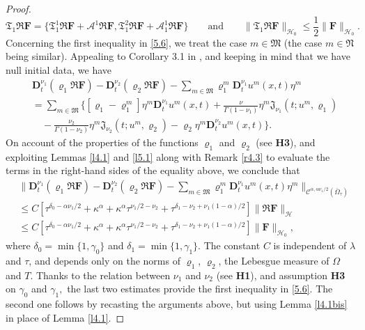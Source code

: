 \documentclass[reqno]{amsart}
\def\C {\mathcal{C}}
\theoremstyle{definition}
\numberwithin{equation}{section}
\begin{document}
\begin{proof}
\[
\mathfrak{T}_{1} \mathfrak{R}\mathbf{F}=\{\mathfrak{T}_{1}^{1}\mathfrak{R}\mathbf{F}+\mathcal{A}^{1}\mathfrak{R}\mathbf{F},
\mathfrak{T}_{1}^{2}\mathfrak{R}\mathbf{F}+\mathcal{A}^{1}_{1}\mathfrak{R}\mathbf{F}\}\qquad
\text{and}\qquad
\|\mathfrak{T}_{1} \mathfrak{R}\mathbf{F}\|_{\mathcal{H}_{0}}\leq\frac{1}{2}\|\mathbf{F}\|_{\mathcal{H}_{0}}.
\]
Concerning the first inequality in \eqref{5.6},
we treat the case $m\in\mathfrak{M}$ (the case $m\in\mathfrak{N}$ being similar).
Appealing to  Corollary 3.1 in \cite{KPSV4}, and keeping in mind that we have null initial data, we have
\begin{align*}
&\mathbf{D}_{t}^{\nu_{1}}(\varrho_{1} \mathfrak{R}\mathbf{F})-\mathbf{D}_{t}^{\nu_2}(\varrho_{2} \mathfrak{R}\mathbf{F})
-\sum_{m\in\mathfrak{M}}\varrho_{1}^{m}\mathbf{D}_{t}^{\nu_{1}}u^{m}(x,t)\eta^{m}\\
&=
\sum_{m\in\mathfrak{M}}\{[\varrho_{1}-\varrho_{1}^{m}]\eta^{m}\mathbf{D}_{t}^{\nu_{1}}u^{m}(x,t)
+\frac{\nu}{\Gamma(1-\nu_{1})}\eta^{m}\mathfrak{J}_{\nu_{1}}(t;u^{m},\varrho_{1})\\
&\quad -
\frac{\nu_2}{\Gamma(1-\nu_2)}\eta^{m}\mathfrak{J}_{\nu_2}(t;u^{m},\varrho_{2})
-\varrho_2\eta^{m}\mathbf{D}_{t}^{\nu_2}u^{m}(x,t)\}.
\end{align*}
On account of the properties of the functions $\varrho_1$ and $\varrho_2$ (see \textbf{H3}), and exploiting  Lemmas \ref{l4.1} and \ref{l5.1} along with Remark \ref{r4.3} to evaluate the terms in the right-hand sides of the equality above, we conclude that
\begin{align*}
&\|\mathbf{D}_{t}^{\nu_1}(\varrho_{1} \mathfrak{R}\mathbf{F})-\mathbf{D}_{t}^{\nu_2}(\varrho_2 \mathfrak{R}\mathbf{F})
-\sum_{m\in\mathfrak{M}}\varrho_{1}^{m}\mathbf{D}_{t}^{\nu_1}u^{m}(x,t)\eta^{m}\|_{\C^{\alpha,\alpha\nu_{1}/2}(\bar{\Omega}_{\tau})}\\
&
\leq C[\tau^{\delta_{0}-\alpha\nu_{1}/2}+\kappa^{\alpha}+\kappa^{\alpha}\tau^{\nu_{1}/2-\nu_2}
+\tau^{\delta_{1}-\nu_2+\nu_{1}(1-\alpha)/2}]\|\mathfrak{R}\mathbf{F}\|_{\mathcal{H}}\\
&
\leq C
[\tau^{\delta_0-\alpha\nu_{1}/2}+\kappa^{\alpha}+\kappa^{\alpha}\tau^{\nu_{1}/2-\nu_2}
+\tau^{\delta_{1}-\nu_2+\nu_{1}(1-\alpha)/2}]\|\mathbf{F}\|_{\mathcal{H}_0},
\end{align*}
where $\delta_0=\min\{1,\gamma_0\}$ and $\delta_{1}=\min\{1,\gamma_1\}$.
The constant $C$ is independent of $\lambda$ and $\tau$, and depends only on the norms of $\varrho_1$, $\varrho_2$, the Lebesgue measure of $\Omega$ and $T$.
Thanks to the relation between $\nu_1$ and $\nu_2$ (see \textbf{H1}),
and assumption \textbf{H3} on $\gamma_{0}$ and $\gamma_{1},$
the last two estimates provide the first inequality in \eqref{5.6}.
The second one  follows by recasting the arguments above,
but using Lemma \ref{l4.1bis} in place of  Lemma \ref{l4.1}.
\end{proof}
\end{document}
